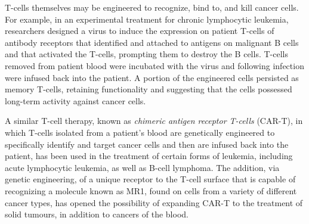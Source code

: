 T-cells themselves may be engineered to recognize, bind to, and kill cancer cells. For example, in an experimental treatment for chronic lymphocytic leukemia, researchers designed a virus to induce the expression on patient T-cells of antibody receptors that identified and attached to antigens on malignant B cells and that activated the T-cells, prompting them to destroy the B cells. T-cells removed from patient blood were incubated with the virus and following infection were infused back into the patient. A portion of the engineered cells persisted as memory T-cells, retaining functionality and suggesting that the cells possessed long-term activity against cancer cells.

A similar T-cell therapy, known as \emph{chimeric antigen receptor T-cells} (CAR-T), in which T-cells isolated from a patient’s blood are genetically engineered to specifically identify and target cancer cells and then are infused back into the patient, has been used in the treatment of certain forms of leukemia, including acute lymphocytic leukemia, as well as B-cell lymphoma. The addition, via genetic engineering, of a unique receptor to the T-cell surface that is capable of recognizing a molecule known as MR1, found on cells from a variety of different cancer types, has opened the possibility of expanding CAR-T to the treatment of solid tumours, in addition to cancers of the blood.


